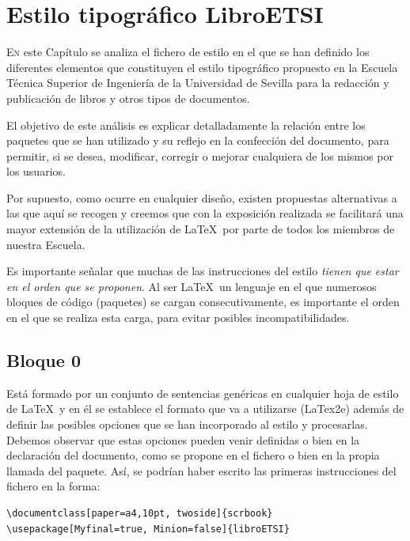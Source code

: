 

\chapter{Estilo tipográfico LibroETSI}\label{estilo}

\lettrine[lraise=-0.1, lines=2, loversize=0.25]{E}{n} este Capítulo se analiza el fichero de estilo  en el que se han definido los diferentes elementos que constituyen el estilo tipográfico propuesto en la Escuela Técnica Superior de Ingeniería de la Universidad de Sevilla para la redacción y publicación de libros y otros tipos de documentos. 

El objetivo de este análisis es explicar detalladamente la relación entre los paquetes que se han utilizado y su reflejo en la confección del documento, para permitir, si se desea, modificar, corregir o mejorar cualquiera de los mismos por los usuarios.

Por supuesto, como ocurre en cualquier diseño, existen propuestas alternativas a las que aquí se recogen y creemos que con la exposición realizada se facilitará una mayor extensión de la utilización de \LaTeX\ por parte de todos los miembros de nuestra Escuela. 

Es importante señalar que muchas de las instrucciones del estilo \emph{tienen que estar en el orden que se proponen}. Al ser \LaTeX\ un lenguaje en el que numerosos bloques de código (paquetes) se cargan consecutivamente, es importante el orden en el que se realiza esta carga, para evitar posibles incompatibilidades.

\section{Bloque 0}

Está formado por un conjunto de sentencias genéricas en cualquier hoja de estilo de \LaTeX\ y en él se establece el formato que va a utilizarse (LaTex2e) además de definir las posibles opciones que se han incorporado al estilo y procesarlas. Debemos observar que estas opciones pueden venir definidas o bien en la declaración del documento, como se propone en el fichero  o bien en la propia llamada del paquete. Así, se podrían haber escrito las primeras instrucciones del fichero  en la forma:

\begin{lstlisting}[rulecolor=\color{white}]
\documentclass[paper=a4,10pt, twoside]{scrbook}
\usepackage[Myfinal=true, Minion=false]{libroETSI}
\end{lstlisting}

